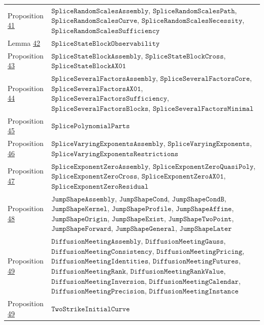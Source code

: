 \documentclass[11pt]{article}
\begin{document}
{\begin{longtable}{lP{384pt}}
Proposition \hyperref[res:Proposition-41]{41} & \(\texttt{SpliceRandomScalesAssembly}\), \(\texttt{SpliceRandomScalesPath}\), \(\texttt{SpliceRandomScalesCurve}\), \(\texttt{SpliceRandomScalesNecessity}\), \(\texttt{SpliceRandomScalesSufficiency}\) \\
Lemma \hyperref[res:Lemma-42]{42} & \(\texttt{SpliceStateBlockObservability}\) \\
Proposition \hyperref[res:Proposition-43]{43} & \(\texttt{SpliceStateBlockAssembly}\), \(\texttt{SpliceStateBlockCross}\), \(\texttt{SpliceStateBlockAX01}\) \\
Proposition \hyperref[res:Proposition-44]{44} & \(\texttt{SpliceSeveralFactorsAssembly}\), \(\texttt{SpliceSeveralFactorsCore}\), \(\texttt{SpliceSeveralFactorsAX01}\), \(\texttt{SpliceSeveralFactorsSufficiency}\), \(\texttt{SpliceSeveralFactorsBlocks}\), \(\texttt{SpliceSeveralFactorsMinimal}\) \\
Proposition \hyperref[res:Proposition-45]{45} & \(\texttt{SplicePolynomialParts}\) \\
Proposition \hyperref[res:Proposition-46]{46} & \(\texttt{SpliceVaryingExponentsAssembly}\), \(\texttt{SpliceVaryingExponents}\), \(\texttt{SpliceVaryingExponentsRestrictions}\) \\
Proposition \hyperref[res:Proposition-47]{47} & \(\texttt{SpliceExponentZeroAssembly}\), \(\texttt{SpliceExponentZeroQuasiPoly}\), \(\texttt{SpliceExponentZeroCross}\), \(\texttt{SpliceExponentZeroAX01}\), \(\texttt{SpliceExponentZeroResidual}\) \\
Proposition \hyperref[res:Proposition-48]{48} & \(\texttt{JumpShapeAssembly}\), \(\texttt{JumpShapeCond}\), \(\texttt{JumpShapeCondB}\), \(\texttt{JumpShapeKernel}\), \(\texttt{JumpShapeProfile}\), \(\texttt{JumpShapeAffine}\), \(\texttt{JumpShapeOrigin}\), \(\texttt{JumpShapeExist}\), \(\texttt{JumpShapeTwoPoint}\), \(\texttt{JumpShapeForward}\), \(\texttt{JumpShapeGeneral}\), \(\texttt{JumpShapeLater}\) \\
Proposition \hyperref[res:Proposition-49]{49} & \(\texttt{DiffusionMeetingAssembly}\), \(\texttt{DiffusionMeetingGauss}\), \(\texttt{DiffusionMeetingConsistency}\), \(\texttt{DiffusionMeetingPricing}\), \(\texttt{DiffusionMeetingIdentities}\), \(\texttt{DiffusionMeetingFutures}\), \(\texttt{DiffusionMeetingRank}\), \(\texttt{DiffusionMeetingRankValue}\), \(\texttt{DiffusionMeetingInversion}\), \(\texttt{DiffusionMeetingCalendar}\), \(\texttt{DiffusionMeetingPrecision}\), \(\texttt{DiffusionMeetingInstance}\) \\
Proposition \hyperref[res:Proposition-49]{49} & \(\texttt{TwoStrikeInitialCurve}\) \\

\end{longtable}}
\end{document}
